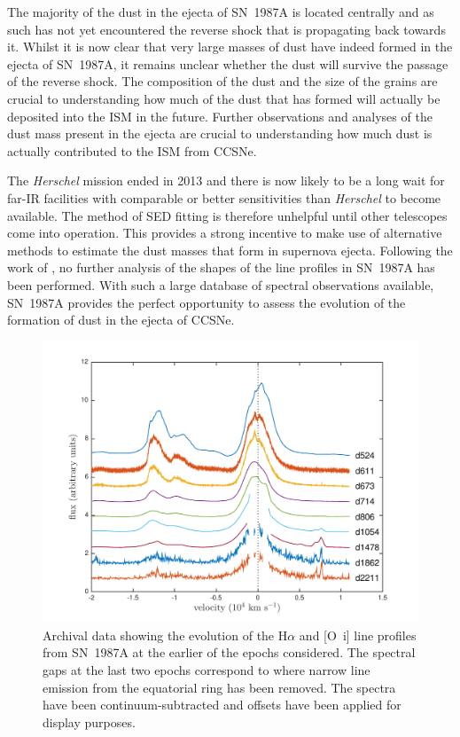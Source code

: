 The majority of the dust in the ejecta of SN~1987A is located centrally and as such has not yet encountered the reverse shock that is propagating back towards it.  Whilst it is now clear that very large masses of dust have indeed formed in the ejecta of SN~1987A, it remains unclear whether the dust will survive the passage of the reverse shock.  The composition of the dust and the size of the grains are crucial to understanding how much of the dust that has formed will actually be deposited into the ISM in the future.  Further observations and analyses of the dust mass present in the ejecta are  crucial to understanding how much dust is actually contributed to the ISM from CCSNe.




The {\em Herschel} mission ended in 2013 and there is now likely to be a long wait for far-IR facilities with comparable or better sensitivities than {\em Herschel} to become available.  The method of SED fitting is therefore unhelpful until other telescopes come into operation.  This provides a strong incentive to make use of alternative methods to estimate the dust masses that form in supernova ejecta.  Following the work of \citet{Lucy1989}, no further analysis of the shapes of the line profiles in SN~1987A has been performed.  With such a large database of spectral observations available, SN~1987A provides the perfect opportunity to assess the evolution of the formation of dust in the ejecta of CCSNe.  

\begin{figure}
\centering
\includegraphics[trim =39 10 45 15,clip=true,scale=0.7]{chapters/chapter5/images/Ha_evol_early_1col2.pdf}
\caption{Archival data showing the evolution of the H$\alpha$ and
[O~{\sc i}] line profiles from SN~1987A at the earlier of the epochs considered. The 
spectral gaps at the last two epochs correspond to where narrow line 
emission from the equatorial ring has been removed. The spectra have been
continuum-subtracted and offsets have been applied for display purposes.}
\label{Ha_evol_early}
\end{figure}

